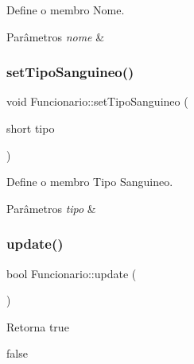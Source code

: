 Define o membro Nome. 


\begin{DoxyParams}{Parâmetros}
{\em nome} & \\
\hline
\end{DoxyParams}
\mbox{\label{classFuncionario_a3e690d80c156f121598a28fb41de7aa1}} 
\subsubsection{\texorpdfstring{set\+Tipo\+Sanguineo()}{setTipoSanguineo()}}
{\footnotesize\ttfamily void Funcionario\+::set\+Tipo\+Sanguineo (\begin{DoxyParamCaption}\item[{short}]{tipo }\end{DoxyParamCaption})}



Define o membro Tipo Sanguineo. 


\begin{DoxyParams}{Parâmetros}
{\em tipo} & \\
\hline
\end{DoxyParams}
\mbox{\label{classFuncionario_a72916b5b2b096630ebc93e4301ee7437}} 
\subsubsection{\texorpdfstring{update()}{update()}}
{\footnotesize\ttfamily bool Funcionario\+::update (\begin{DoxyParamCaption}{ }\end{DoxyParamCaption})}

\begin{DoxyReturn}{Retorna}
true 

false 
\end{DoxyReturn}
\mbox{\label{classFuncionario_ae77b29774b71f1c1e336bcb649765488}} 
